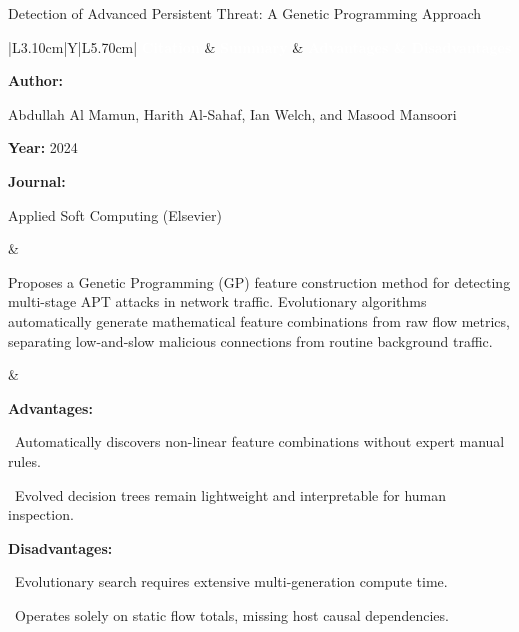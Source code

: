 \documentclass[aspectratio=169,10pt]{beamer}
\newcommand{\lrhdr}{%
  \rowcolor{prismNavy}%
  {\scriptsize\textcolor{white}{\textbf{Citation}}} &
  {\scriptsize\textcolor{white}{\textbf{Summary}}} &
  {\scriptsize\textcolor{white}{\textbf{Advantages \& Disadvantages}}} \\}
\begin{document}
\begin{frame}[t]{Detection of Advanced Persistent Threat: A Genetic Programming Approach}
\vspace{-0.30em}
{\footnotesize\setlength{\tabcolsep}{3.5pt}\renewcommand{\arraystretch}{1.10}
\begin{tabularx}{\textwidth}{|L{3.10cm}|Y|L{5.70cm}|}
\hline\lrhdr\hline
\begin{minipage}[t]{\linewidth}\fontsize{7.2pt}{9.2pt}\raggedright\selectfont
\textbf{Author:}\par
Abdullah Al Mamun, Harith Al-Sahaf, Ian Welch, and Masood Mansoori\par\vspace{4pt}
\textbf{Year:} 2024\par\vspace{4pt}
\textbf{Journal:}\par
Applied Soft Computing (Elsevier)\par\vspace{4pt}
\end{minipage}
&
\begin{minipage}[t]{\linewidth}\fontsize{7.2pt}{9.2pt}\raggedright\selectfont
Proposes a Genetic Programming (GP) feature construction method for detecting multi-stage APT attacks in network traffic. Evolutionary algorithms automatically generate mathematical feature combinations from raw flow metrics, separating low-and-slow malicious connections from routine background traffic.\par\vspace{4pt}
\end{minipage}
&
\begin{minipage}[t]{\linewidth}\fontsize{7.2pt}{9.0pt}\raggedright\selectfont
\textcolor{strengthGreen}{\textbf{Advantages:}}\par\vspace{1.5pt}
\textbullet~Automatically discovers non-linear feature combinations without expert manual rules.\par\vspace{2.0pt}\textbullet~Evolved decision trees remain lightweight and interpretable for human inspection.\par\vspace{4.0pt}
\textcolor{limitRed}{\textbf{Disadvantages:}}\par\vspace{1.5pt}
\textbullet~Evolutionary search requires extensive multi-generation compute time.\par\vspace{2.0pt}\textbullet~Operates solely on static flow totals, missing host causal dependencies.\par\vspace{4pt}
\end{minipage} \\\hline
\end{tabularx}}
\end{frame}
\end{document}
